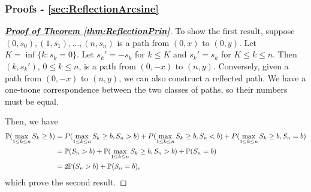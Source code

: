 \documentclass[10pt,a4paper]{article}
\begin{document}
\subsubsection{Proofs - \ref{sec:ReflectionArcsine}}\label{sec:proof-ReflectionArcsine}
\begin{proof}[\underline{\textbf{Proof of Theorem \ref{thm:ReflectionPrin}}}]
	To show the first result, suppose $(0,s_0),(1,s_1),\ldots,(n,s_n)$ is a path from $(0,x)$ to $(0,y)$. Let $K=\inf\{k:s_k=0\}$. Let $s_k'=-s_k$ for $k\leq K$ and $s_k'=s_k$ for $K\leq k\leq n$. Then $(k,s_k')$, $0\leq k\leq n$, is a path from $(0,-x)$ to $(n,y)$. Conversely, given a path from $(0,-x)$ to $(n,y)$, we can also construct a reflected path. We have a one-toone
	correspondence between the two classes of paths, so their numbers must be
	equal.

	Then, we have 
	\begin{equation*}
		\begin{aligned}
			\mathbb P(\max_{1\leq k\leq n}S_k\geq b)&=P(\max_{1\leq k\leq n}S_k\geq b,S_n>b)+P(\max_{1\leq k\leq n}S_k\geq b,S_n<b)+P(\max_{1\leq k\leq n}S_k\geq b,S_n=b) \\
			&=\mathbb P(S_n>b) + \mathbb P (\max_{1\leq k\leq n}S_k\geq b,S_n>b) + \mathbb P(S_n=b)\\
			&=2\mathbb P(S_n>b) + \mathbb P(S_n=b),
	\end{aligned}
	\end{equation*}
	which prove the second result.
\end{proof}
\end{document}
